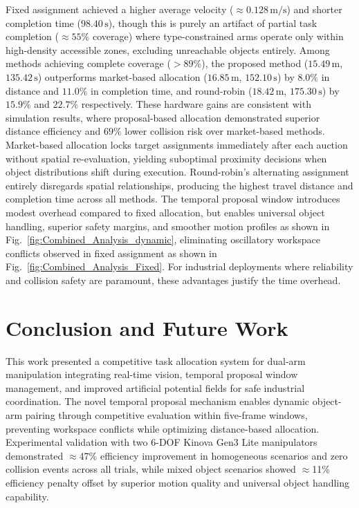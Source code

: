 \documentclass[pdflatex,sn-mathphys-num]{sn-jnl}%
\theoremstyle{thmstyleone}%
\theoremstyle{thmstylethree}%
\begin{document}
Fixed assignment achieved a higher average velocity ($\approx 0.128\,\text{m/s}$) and shorter completion time ($98.40\,\text{s}$), though this is purely an artifact of partial task completion ($\approx 55\%$ coverage) where type-constrained arms operate only within high-density accessible zones, excluding unreachable objects entirely. Among methods achieving complete coverage ($>89\%$), the proposed method ($15.49\,\text{m}$, $135.42\,\text{s}$) outperforms market-based allocation ($16.85\,\text{m}$, $152.10\,\text{s}$) by $8.0\%$ in distance and $11.0\%$ in completion time, and round-robin ($18.42\,\text{m}$, $175.30\,\text{s}$) by $15.9\%$ and $22.7\%$ respectively. These hardware gains are consistent with simulation results, where proposal-based allocation demonstrated superior distance efficiency and $69\%$ lower collision risk over market-based methods. Market-based allocation locks target assignments immediately after each auction without spatial re-evaluation, yielding suboptimal proximity decisions when object distributions shift during execution. Round-robin's alternating assignment entirely disregards spatial relationships, producing the highest travel distance and completion time across all methods. The temporal proposal window introduces modest overhead compared to fixed allocation, but enables universal object handling, superior safety margins, and smoother motion profiles as shown in Fig.~\ref{fig:Combined_Analysis_dynamic}, eliminating oscillatory workspace conflicts observed in fixed assignment as shown in Fig.~\ref{fig:Combined_Analysis_Fixed}. For industrial deployments where reliability and collision safety are paramount, these advantages justify the time overhead.
\section{Conclusion and Future Work}
\label{concl}
This work presented a competitive task allocation system for dual-arm manipulation integrating real-time vision, temporal proposal window management, and improved artificial potential fields for safe industrial coordination. The novel temporal proposal mechanism enables dynamic object-arm pairing through competitive evaluation within five-frame windows, preventing workspace conflicts while optimizing distance-based allocation. Experimental validation with two 6-DOF Kinova Gen3 Lite manipulators demonstrated $\approx$47\% efficiency improvement in homogeneous scenarios and zero collision events across all trials, while mixed object scenarios showed $\approx$11\% efficiency penalty offset by superior motion quality and universal object handling capability.
\end{document}
